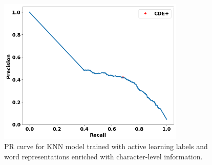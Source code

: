 \begin{figure}
\centering
\includegraphics[trim=0in 0.1in 0.1in 0.in,clip,width=3.5in]{figures/fasttext_prc_al_corpus_round5_100}
\caption{PR curve for KNN model trained with active learning labels and word representations enriched with character-level information.}\label{fig:UBS_prcs_fasttext}
\end{figure}











